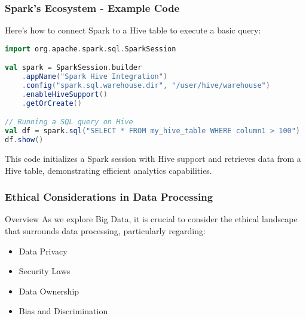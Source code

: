 \documentclass[aspectratio=169]{beamer}
\begin{document}
\begin{frame}[fragile]
    \frametitle{Spark's Ecosystem - Example Code}
    Here’s how to connect Spark to a Hive table to execute a basic query:

    \begin{lstlisting}[language=scala]
import org.apache.spark.sql.SparkSession

val spark = SparkSession.builder
    .appName("Spark Hive Integration")
    .config("spark.sql.warehouse.dir", "/user/hive/warehouse")
    .enableHiveSupport()
    .getOrCreate()

// Running a SQL query on Hive
val df = spark.sql("SELECT * FROM my_hive_table WHERE column1 > 100")
df.show()
    \end{lstlisting}
    
    This code initializes a Spark session with Hive support and retrieves data from a Hive table, demonstrating efficient analytics capabilities.
\end{frame}

\begin{frame}[fragile]
    \frametitle{Ethical Considerations in Data Processing}
    
    \begin{block}{Overview}
        As we explore Big Data, it is crucial to consider the ethical landscape that surrounds data processing, particularly regarding:
        \begin{itemize}
            \item Data Privacy
            \item Security Laws
            \item Data Ownership
            \item Bias and Discrimination
        \end{itemize}
    \end{block}
\end{frame}
\end{document}
